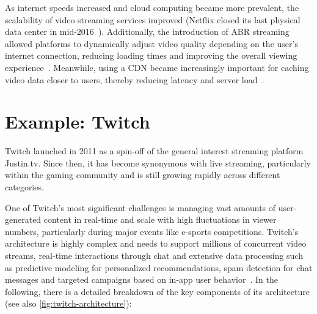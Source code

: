 \noindent As internet speeds increased and cloud computing became more prevalent, the scalability of video streaming services improved (Netflix closed its last physical data center in mid-2016~\parencite{netflix_cloud}).
Additionally, the introduction of \ac{ABR} streaming allowed platforms to dynamically adjust video quality depending on the user's internet connection, reducing loading times and improving the overall viewing experience~\parencite{abr}. Meanwhile, using a \ac{CDN} became increasingly important for caching video data closer to users, thereby reducing latency and server load~\parencite{cdn_basic}.

\section{Example: Twitch}
Twitch launched in 2011 as a spin-off of the general interest streaming platform Justin.tv. Since then, it has become synonymous with live streaming, particularly within the gaming community and is still growing rapidly across different categories. 

One of Twitch's most significant challenges is managing vast amounts of user-generated content in real-time and scale with high fluctuations in viewer numbers, particularly during major events like e-sports competitions.
Twitch's architecture is highly complex and needs to support millions of concurrent video streams, real-time interactions through chat and extensive data processing such as predictive modeling for personalized recommendations, spam detection for chat messages and targeted campaigns based on in-app user behavior~\parencite{twitch_analytics}. In the following, there is a detailed breakdown of the key components of its architecture (see also \autoref{fig:twitch-architecture}):

